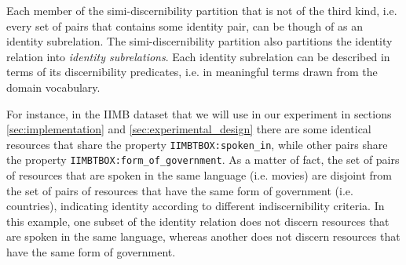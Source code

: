 \noindent Each member of the simi-discernibility partition that is not
  of the third kind, i.e. every set of pairs that contains some identity pair,
  can be though of as an identity subrelation.
The simi-discernibility partition also partitions the identity relation
  into \emph{identity subrelations}.
Each identity subrelation can be described in terms of
  its discernibility predicates,
  i.e. in meaningful terms drawn from the domain vocabulary.

For instance, in the IIMB dataset that we will use in our experiment
  in sections \ref{sec:implementation} and \ref{sec:experimental_design}
  there are some identical resources that share
  the property {\small \texttt{IIMBTBOX:spoken\_in}},
  while other pairs share the property
  {\small \texttt{IIMBTBOX:form\_of\_government}}.
As a matter of fact, the set of pairs of resources that are spoken in
  the same language (i.e. movies) are disjoint from
  the set of pairs of resources that have the same form of government
  (i.e. countries), indicating identity according to
  different indiscernibility criteria.
In this example, one subset of the identity relation does not discern
  resources that are spoken in the same language,
  whereas another does not discern resources that have
  the same form of government.



\begin{comment}
Fig. 1 shows an example
  of a discernibility partitioning for a given identity relation.

We can thus identify subsets of an identity relation based on
  differences in the sets of properties relative to which
  the resource pairs that they consist of are
  (in)discernible from one another.
Identity of indiscernibility criteria provides
  another equivalence relation
  ($\approx_{\indp}$, def. \ref{def:indiscernibility_partition}),
  that partitions the identity relation $\approx$ into
  identity subrelations that characterize identity based on different
  indiscernibility criteria.

\begin{figure*}
\label{fig:iimb_example}
\centering
\texttt{[image: iimb\_approximation\_example\_crop]}
\caption{
  An example of a discernibility partition for an identity relation
    consisting of 365 pairs applied to the fourth IIMB linkset.
  Each node is annotated with the set of predicates $P$ for which
    its pairs are $P$-indiscernible.
  The number of identity pairs within each partition set
    is displayed to the right of the predicate set label.
  Partition sets that contain no identity pair are not show.
  The number that occurs to the left of the predicate label in each node
    indicates how may pairs in that node are identity pairs.
  The lower approximation consists of the nodes with a solid border,
    indicating that they contain only identity pairs.
  The higher approximation consists of all displayed nodes.}
\end{figure*}
\end{comment}

